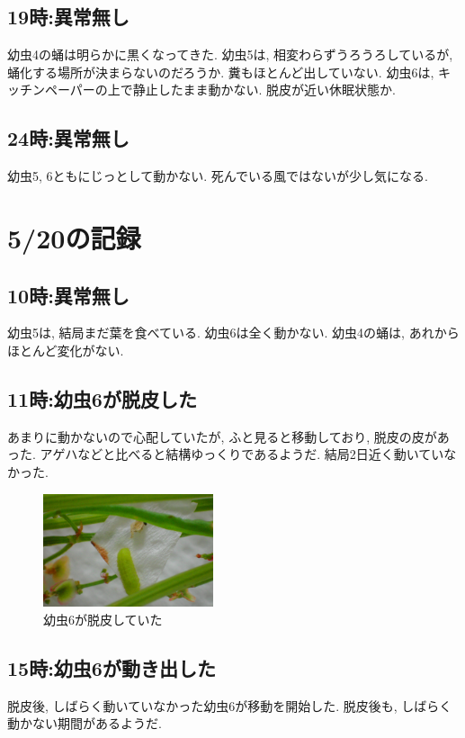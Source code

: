 \documentclass{jsarticle}
\begin{document}
\subsection{19時:異常無し}
幼虫4の蛹は明らかに黒くなってきた. 
幼虫5は, 相変わらずうろうろしているが, 蛹化する場所が決まらないのだろうか. 糞もほとんど出していない. 
幼虫6は, キッチンペーパーの上で静止したまま動かない. 脱皮が近い休眠状態か. 

\subsection{24時:異常無し}
幼虫5, 6ともにじっとして動かない. 死んでいる風ではないが少し気になる. 

\section{5/20の記録}
\subsection{10時:異常無し}
幼虫5は, 結局まだ葉を食べている. 幼虫6は全く動かない. 
幼虫4の蛹は, あれからほとんど変化がない. 

\subsection{11時:幼虫6が脱皮した}
あまりに動かないので心配していたが, ふと見ると移動しており, 脱皮の皮があった. 
アゲハなどと比べると結構ゆっくりであるようだ. 結局2日近く動いていなかった. 

\begin{figure}[htbp]
  \begin{center}
    \includegraphics[width=5cm]{photo7/Larva6-Molting.JPG}
  \end{center}
  \caption{幼虫6が脱皮していた}
\end{figure}

\subsection{15時:幼虫6が動き出した}
脱皮後, しばらく動いていなかった幼虫6が移動を開始した. 脱皮後も, しばらく動かない期間があるようだ. 
\end{document}
